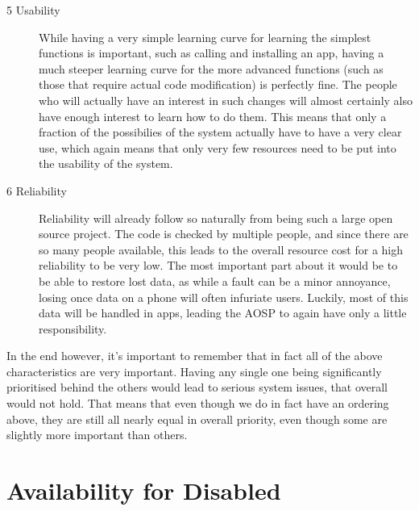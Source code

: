 \documentclass[conference]{IEEEtran}
\begin{document}
\begin{description}
\item[5 Usability] While having a very simple learning curve for learning the simplest functions is important, such as calling and installing an app, having a much steeper learning curve for the more advanced functions (such as those that require actual code modification) is perfectly fine. The people who will actually have an interest in such changes will almost certainly also have enough interest to learn how to do them. This means that only a fraction of the possibilies of the system actually have to have a very clear use, which again means that only very few resources need to be put into the usability of the system.
\item[6 Reliability] Reliability will already follow so naturally from being such a large open source project. The code is checked by multiple people, and since there are so many people available, this leads to the overall resource cost for a high reliability to be very low. The most important part about it would be to be able to restore lost data, as while a fault can be a minor annoyance, losing once data on a phone will often infuriate users. Luckily, most of this data will be handled in apps, leading the AOSP to again have only a little responsibility. 
\end{description}

In the end however, it's important to remember that in fact all of the above characteristics are very important. Having any single one being significantly prioritised behind the others would lead to serious system issues, that overall would not hold. That means that even though we do in fact have an ordering above, they are still all nearly equal in overall priority, even though some are slightly more important than others. 

\section{Availability for Disabled}
\label{availability}

\end{document}
